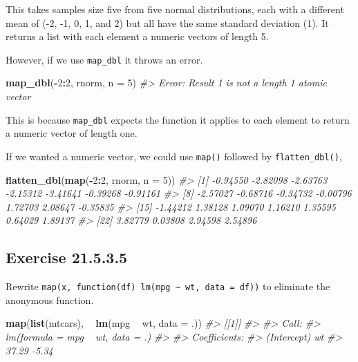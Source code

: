 \documentclass[]{book}
\newenvironment{Shaded}{\begin{snugshade}}{\end{snugshade}}
\newcommand{\CommentTok}[1]{\textcolor[rgb]{0.56,0.35,0.01}{\textit{#1}}}
\newcommand{\DataTypeTok}[1]{\textcolor[rgb]{0.13,0.29,0.53}{#1}}
\newcommand{\DecValTok}[1]{\textcolor[rgb]{0.00,0.00,0.81}{#1}}
\newcommand{\KeywordTok}[1]{\textcolor[rgb]{0.13,0.29,0.53}{\textbf{#1}}}
\newcommand{\NormalTok}[1]{#1}
\newcommand{\OperatorTok}[1]{\textcolor[rgb]{0.81,0.36,0.00}{\textbf{#1}}}
\newcommand{\StringTok}[1]{\textcolor[rgb]{0.31,0.60,0.02}{#1}}
\theoremstyle{plain}
\theoremstyle{remark}
\begin{document}
This takes samples size five from five normal distributions, each with a different mean of (-2, -1, 0, 1, and 2) but all have the same standard deviation (1). It returns a list with each element a numeric vectors of length 5.

However, if we use \texttt{map\_dbl} it throws an error.

\begin{Shaded}
\begin{Highlighting}[]
\KeywordTok{map_dbl}\NormalTok{(}\OperatorTok{-}\DecValTok{2}\OperatorTok{:}\DecValTok{2}\NormalTok{, rnorm, }\DataTypeTok{n =} \DecValTok{5}\NormalTok{)}
\CommentTok{#> Error: Result 1 is not a length 1 atomic vector}
\end{Highlighting}
\end{Shaded}

This is because \texttt{map\_dbl} expects the function it applies to each element to
return a numeric vector of length one.

If we wanted a numeric vector, we could use \texttt{map()} followed by \texttt{flatten\_dbl()},

\begin{Shaded}
\begin{Highlighting}[]
\KeywordTok{flatten_dbl}\NormalTok{(}\KeywordTok{map}\NormalTok{(}\OperatorTok{-}\DecValTok{2}\OperatorTok{:}\DecValTok{2}\NormalTok{, rnorm, }\DataTypeTok{n =} \DecValTok{5}\NormalTok{))}
\CommentTok{#>  [1] -0.94550 -2.82098 -2.63763 -2.15312 -3.41641 -0.39268 -0.91161}
\CommentTok{#>  [8] -2.57027 -0.68716 -0.34732 -0.00796  1.72703  2.08647 -0.35835}
\CommentTok{#> [15] -1.44212  1.38128  1.09070  1.16210  1.35595  0.64029  1.89137}
\CommentTok{#> [22]  3.82779  0.03808  2.94598  2.54896}
\end{Highlighting}
\end{Shaded}

\hypertarget{exercise-21.5.3.5}{%
\subsection*{\texorpdfstring{Exercise {21.5.3.5}}{Exercise 21.5.3.5}}\label{exercise-21.5.3.5}}

Rewrite \texttt{map(x,\ function(df)\ lm(mpg\ \textasciitilde{}\ wt,\ data\ =\ df))} to eliminate the anonymous function.

\begin{Shaded}
\begin{Highlighting}[]
\KeywordTok{map}\NormalTok{(}\KeywordTok{list}\NormalTok{(mtcars), }\OperatorTok{~}\StringTok{ }\KeywordTok{lm}\NormalTok{(mpg }\OperatorTok{~}\StringTok{ }\NormalTok{wt, }\DataTypeTok{data =}\NormalTok{ .))}
\CommentTok{#> [[1]]}
\CommentTok{#> }
\CommentTok{#> Call:}
\CommentTok{#> lm(formula = mpg ~ wt, data = .)}
\CommentTok{#> }
\CommentTok{#> Coefficients:}
\CommentTok{#> (Intercept)           wt  }
\CommentTok{#>       37.29        -5.34}
\end{Highlighting}
\end{Shaded}
\end{document}
